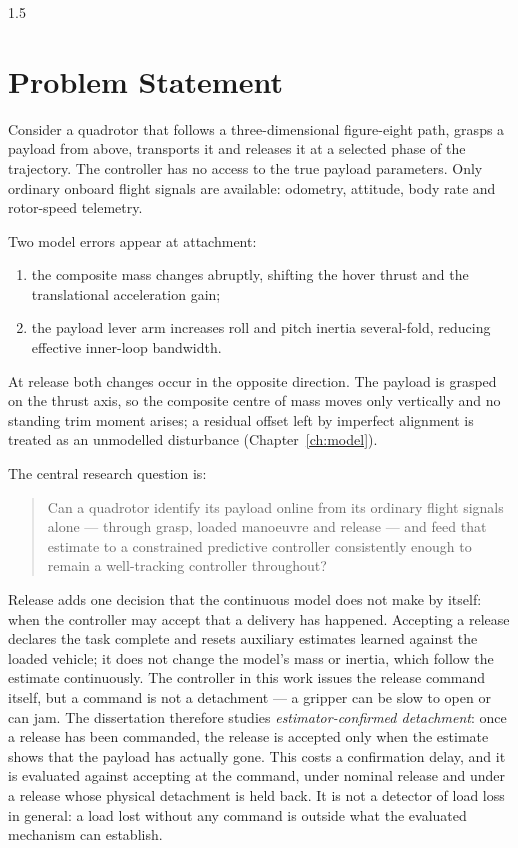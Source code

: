 \begin{spacing}{1.5}
\section{Problem Statement}

Consider a quadrotor that follows a three-dimensional figure-eight path, grasps
a payload from above, transports it and releases it at a selected phase of the
trajectory. The controller has no access to the true payload parameters. Only
ordinary onboard flight signals are available: odometry, attitude, body rate and
rotor-speed telemetry.

Two model errors appear at attachment:
\begin{enumerate}
\item the composite mass changes abruptly, shifting the hover thrust and the
translational acceleration gain;
\item the payload lever arm increases roll and pitch inertia several-fold,
reducing effective inner-loop bandwidth.
\end{enumerate}
At release both changes occur in the opposite direction. The payload is grasped
on the thrust axis, so the composite centre of mass moves only vertically and no
standing trim moment arises; a residual offset left by imperfect alignment is
treated as an unmodelled disturbance (Chapter~\ref{ch:model}).

The central research question is:

\begin{quote}
Can a quadrotor identify its payload online from its ordinary flight signals
alone --- through grasp, loaded manoeuvre and release --- and feed that estimate
to a constrained predictive controller consistently enough to remain a
well-tracking controller throughout?
\end{quote}

Release adds one decision that the continuous model does not make by itself:
when the controller may accept that a delivery has happened. Accepting a release
declares the task complete and resets auxiliary estimates learned against the
loaded vehicle; it does not change the model's mass or inertia, which follow the
estimate continuously. The controller in this work issues the release command
itself, but a command is not a detachment --- a gripper can be slow to open or
can jam. The dissertation therefore studies \emph{estimator-confirmed
detachment}: once a release has been commanded, the release is accepted only when
the estimate shows that the payload has actually gone. This costs a confirmation
delay, and it is evaluated against accepting at the command, under nominal
release and under a release whose physical detachment is held back. It is not a
detector of load loss in general: a load lost without any command is outside what
the evaluated mechanism can establish.


\end{spacing}
